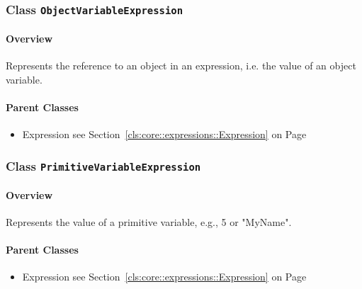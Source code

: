 \subsubsection{\Large{Class \bfseries \texttt{ObjectVariableExpression}\normalfont}}
\label{cls:storydiagrams::patterns::expressions::ObjectVariableExpression} 
\paragraph{Overview}

	
			
Represents the reference to an object in an expression, i.e. the value of an object variable.	
		
	



\paragraph{Parent Classes}
\begin{itemize}
\item Expression see Section~\ref{cls:core::expressions::Expression} on Page~\pageref{cls:core::expressions::Expression}\end{itemize}
\subsubsection{\Large{Class \bfseries \texttt{PrimitiveVariableExpression}\normalfont}}
\label{cls:storydiagrams::patterns::expressions::PrimitiveVariableExpression} 
\paragraph{Overview}

	
			
Represents the value of a primitive variable, e.g., 5 or "MyName".	
		
	



\paragraph{Parent Classes}
\begin{itemize}
\item Expression see Section~\ref{cls:core::expressions::Expression} on Page~\pageref{cls:core::expressions::Expression}\end{itemize}
\newpage
		


